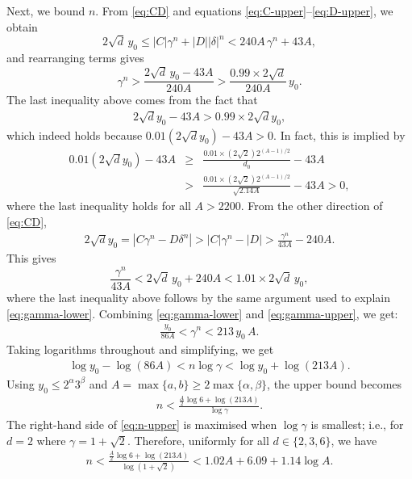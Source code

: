 \documentclass[11pt,a4paper]{article}
\numberwithin{equation}{section}
\numberwithin{table}{section}
\numberwithin{figure}{section}
\begin{document}
Next, we bound $n$. From \eqref{eq:CD} and equations \eqref{eq:C-upper}--\eqref{eq:D-upper}, we obtain
\begin{equation*}
	2\sqrt{d}\,y_0 \leq |C|\gamma^n + |D||\delta|^n
	< 240A\,\gamma^n + 43A,
\end{equation*}
and rearranging terms gives
\begin{equation}\label{eq:gamma-lower}
	\gamma^n > \frac{2\sqrt{d}\,y_0 - 43A}{240A}
	> \frac{0.99\times 2\sqrt{d}}{240A}\,y_0.
\end{equation}
The last inequality above comes from the fact that 
\begin{align*}
	2{\sqrt{d}}y_0-43A>0.99\times 2{\sqrt{d}} y_0,
\end{align*}
which indeed holds because $ 0.01 (2{\sqrt{d}} y_0)-43A>0$. In fact, this is implied by 
\begin{eqnarray*}
	\label{eq:14}
	0.01 (2{\sqrt{d}} y_0) -43A & \ge & \frac{0.01 \times (2{\sqrt{2}}) 2^{(A-1)/2}}{d_0}-43A\nonumber\\
	& > & \frac{0.01\times ({2{\sqrt{2}}}) 2^{(A-1)/2}}{{\sqrt{2.14A}}}-43A>0,
\end{eqnarray*}
where the last inequality holds for all $A>2200$. From the other direction of \eqref{eq:CD},
\begin{align*}
	2{\sqrt{d}} y_0=|C\gamma^n-D\delta^n|>|C|\gamma^n-|D|>\frac{\gamma^n}{43A}-240A.
\end{align*}
This gives
\begin{equation}\label{eq:gamma-upper}
	\frac{\gamma^n}{43A} < 2\sqrt{d}\,y_0 + 240A
	< 1.01\times 2\sqrt{d}\,y_0,
\end{equation}
where the last inequality above follows by the same argument used to explain \eqref{eq:gamma-lower}. Combining \eqref{eq:gamma-lower} and \eqref{eq:gamma-upper}, we get:
\begin{align*}
	\frac{y_0}{86A} < \gamma^n < 213\,y_0\,A.
\end{align*}
Taking logarithms throughout and simplifying, we get
\begin{align*}
	\log y_0 - \log(86A) < n\log\gamma < \log y_0 + \log(213A).
\end{align*}
Using $y_0 \leq 2^\alpha 3^\beta$ and $A = \max\{a,b\} \geq 2\max\{\alpha,\beta\}$,
the upper bound becomes
\begin{align}\label{eq:n-upper}
	n < \frac{\tfrac{A}{2}\log 6 + \log(213A)}{\log\gamma}.
\end{align}
The right-hand side of \eqref{eq:n-upper} is maximised when $\log\gamma$ is smallest; i.e., for $d=2$ where $\gamma = 1+\sqrt{2}$. Therefore, uniformly for all $d \in \{2,3,6\}$, we have
\begin{align*}
	n < \frac{\tfrac{A}{2}\log 6+\log(213A)}{\log(1+\sqrt{2})}
	< 1.02A + 6.09 + 1.14\log A.
\end{align*}
\end{document}
